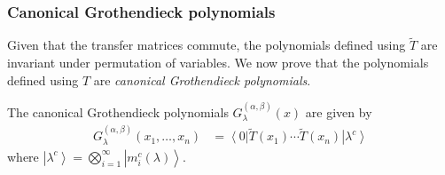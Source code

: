 \documentclass[ALCO, Unicode]{cedram}
\newcommand{\bra}[1]{\left\langle #1\right|}
\newcommand{\ket}[1]{\left|#1\right\rangle}
\newcommand\Gg{{G^{(\alpha,\beta)}_{\lambda}}}
\begin{document}
\subsubsection{Canonical Grothendieck polynomials}
Given that the transfer matrices commute, the polynomials defined using $\widetilde{T}$ are invariant under permutation of  variables. We now prove that the polynomials defined using $T$ are \emph{canonical Grothendieck polynomials}.

\begin{thm}
\label{thm:colG}
The canonical Grothendieck polynomials $\Gg(x)$  are given by
%
\begin{align}
\label{colG}
\Gg(x_1,\dots,x_n)
&=
\bra{0}
\widetilde{T}(x_1)
\cdots
\widetilde{T}(x_n)
\ket{\lambda^c}
\end{align}
%
where $\ket{\lambda^c} = \bigotimes_{i=1}^{\infty} \ket{m^c_i(\lambda)}$.
\end{thm}
\end{document}
